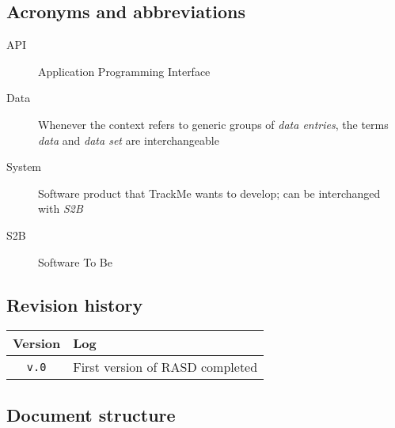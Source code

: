   \subsection{Acronyms and abbreviations}

      \begin{description}
        \item[API] Application Programming Interface
        \item[Data] Whenever the context refers to generic groups of \textit{data entries}, the terms \textit{data} and \textit{data set} are interchangeable
        \item[System] Software product that TrackMe wants to develop; can be interchanged with \textit{S2B}
        \item[S2B] Software To Be
      \end{description}

  \subsection{Revision history}

  \label{sec:revhistory}
    \begin{table}[!h]
      \begin{tabular}{|c|l|}
        \hline
        \textbf{Version}                & \textbf{Log} \\ \hline
        \texttt{v.0} &
          First version of RASD completed
        \\
 \hline
      \end{tabular}
    \end{table}


  \subsection{Document structure}

